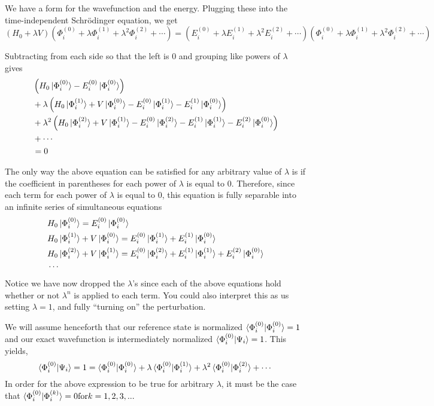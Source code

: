 \documentclass{article}
\newcommand{\lam}{\lambda}
\newcommand{\Phizero}{\Phi^{(0)}}
\newcommand{\Phione}{\Phi^{(1)}}
\begin{document}
We have a form for the wavefunction and the energy. Plugging these 
into the time-independent Schr{\"o}dinger equation, we get 
\[
(H_0 + \lam V) (\Phi_i^{(0)} +  \lam \Phi_i^{(1)} + \lam^2 \Phi_i^{(2)} + \cdots)
=  (E_i^{(0)} +  \lam E_i^{(1)} + \lam^2 E_i^{(2)}  + \cdots ) (\Phi_i^{(0)} +  \lam \Phi_i^{(1)} + \lam^2 \Phi_i^{(2)} + \cdots)
 \]

Subtracting from each side so that the left is 0 and grouping like powers of $\lam$ gives
\begin{align*}
&  \left(H_0 \ket{\Phi_i^{(0)}} - E_i^{(0)} \ket{\Phi_i^{(0)}}   \right) \\
&+ \lam \left( H_0\ket{\Phi_i^{(1)}} + V\ket{\Phi_i^{(0)}} - E_i^{(0)}\ket{\Phi_i^{(1)}} - E_i^{(1)}\ket{\Phi_i^{(0)}} \right)  \\
&+ \lam^2 \left( H_0 \ket{\Phi_i^{(2)}} + V \ket{\Phi_i^{(1)}} - E_i^{(0)} \ket{\Phi_i^{(2)}} - E_i^{(1)} \ket{\Phi_i^{(1)}} - E_i^{(2)} \ket{\Phi_i^{(0)}}  \right)  \\
&+ \cdots \\ 
&= 0
\end{align*}

The only way the above equation can be satisfied for any arbitrary value of $\lam$ is 
    if the coefficient in parentheses for each power of $\lam$ is equal to 0.
Therefore, since each term for each power of $\lam$ is equal to 0,
    this equation is fully separable into an infinite series of simultaneous equations
\begin{align*}
&  H_0 \ket{\Phi_i^{(0)}} = E_i^{(0)} \ket{\Phi_i^{(0)}}   \\
&  H_0\ket{\Phi_i^{(1)}} + V\ket{\Phi_i^{(0)}} = E_i^{(0)}\ket{\Phi_i^{(1)}} + E_i^{(1)}\ket{\Phi_i^{(0)}}  \\
&  H_0 \ket{\Phi_i^{(2)}} + V \ket{\Phi_i^{(1)}} = E_i^{(0)} \ket{\Phi_i^{(2)}} + E_i^{(1)} \ket{\Phi_i^{(1)}} + E_i^{(2)} \ket{\Phi_i^{(0)}}  \\
& \cdots \\ 
\end{align*}
Notice we have now dropped the $\lam$'s since each of the above equations hold whether or not $\lam^n$ is applied to each term.
You could also interpret this as us setting $\lam=1$, and fully ``turning on'' the perturbation.

We will assume henceforth that our reference state is normalized  $\braket{\Phizero_i | \Phizero_i} = 1$
and our exact wavefunction is intermediately normalized $\braket{\Phizero_i | \Psi_i} = 1$.
This yields,
\[\braket{\Phizero_i | \Psi_i} = 1 = \braket{\Phizero_i | \Phizero_i} + \lam \braket{\Phizero_i | \Phione_i} + \lam^2 \braket{\Phizero_i|\Phi_i^{(2)}} + \cdots \]
In order for the above expression to be true for arbitrary $\lam$,
it must be the case that $\braket{\Phizero_i | \Phi_i^{(k)}} = 0 \space \mathrm{for} \space k = 1,2,3,...$
\end{document}
